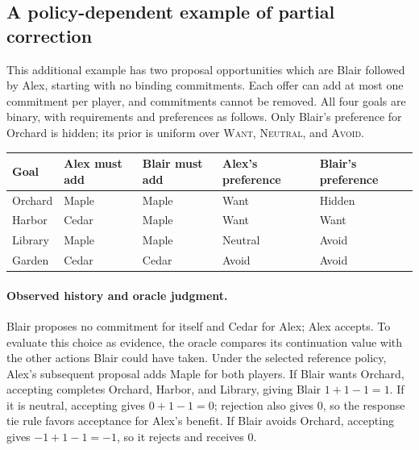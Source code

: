 \subsection{A policy-dependent example of partial correction}

\label{app:diagnose-example}

This additional example has two proposal opportunities which are
Blair followed by Alex, starting with no binding commitments. Each offer can
add at most one commitment per player, and commitments cannot be removed.
All four goals are binary, with requirements and preferences as follows.
Only Blair's preference for Orchard is hidden; its prior is uniform over
\textsc{Want}, \textsc{Neutral}, and \textsc{Avoid}.
\begin{center}
\small
\begin{tabular}{lllll}
\hline
Goal & Alex must add & Blair must add & Alex's preference & Blair's preference \\
\hline
Orchard & Maple & Maple & Want & Hidden \\
Harbor & Cedar & Maple & Want & Want \\
Library & Maple & Maple & Neutral & Avoid \\
Garden & Cedar & Cedar & Avoid & Avoid \\
\hline
\end{tabular}
\end{center}

\paragraph{Observed history and oracle judgment.}
Blair proposes no commitment for itself and Cedar for Alex; Alex accepts.
To evaluate this choice as evidence, the oracle compares its continuation
value with the other actions Blair could have taken. Under the selected
reference policy, Alex's subsequent proposal adds Maple for both players.
If Blair wants Orchard, accepting completes Orchard, Harbor, and Library,
giving Blair $1+1-1=1$. If it is neutral, accepting gives $0+1-1=0$;
rejection also gives $0$, so the response tie rule favors acceptance for
Alex's benefit. If Blair avoids Orchard, accepting gives $-1+1-1=-1$,
so it rejects and receives $0$.

